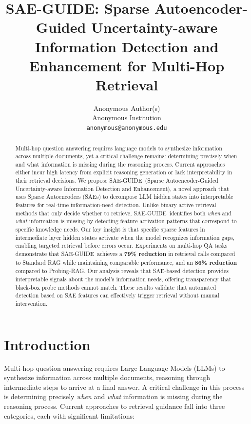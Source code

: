 \documentclass{article}
\title{SAE-GUIDE: Sparse Autoencoder-Guided Uncertainty-aware\\
Information Detection and Enhancement for Multi-Hop Retrieval}
\author{Anonymous Author(s)\\
Anonymous Institution\\
\texttt{anonymous@anonymous.edu}
}
\date{}
\newcommand{\ours}{SAE-GUIDE}
\begin{document}
\maketitle

\thispagestyle{fancy}

\begin{abstract}
Multi-hop question answering requires language models to synthesize information across multiple documents, yet a critical challenge remains: determining precisely when and what information is missing during the reasoning process. Current approaches either incur high latency from explicit reasoning generation or lack interpretability in their retrieval decisions. We propose \ours\ (Sparse Autoencoder-Guided Uncertainty-aware Information Detection and Enhancement), a novel approach that uses Sparse Autoencoders (SAEs) to decompose LLM hidden states into interpretable features for real-time information-need detection. Unlike binary active retrieval methods that only decide whether to retrieve, \ours\ identifies both \textit{when} and \textit{what} information is missing by detecting feature activation patterns that correspond to specific knowledge needs. Our key insight is that specific sparse features in intermediate layer hidden states activate when the model recognizes information gaps, enabling targeted retrieval before errors occur. Experiments on multi-hop QA tasks demonstrate that \ours\ achieves a \textbf{79\% reduction} in retrieval calls compared to Standard RAG while maintaining comparable performance, and an \textbf{86\% reduction} compared to Probing-RAG. Our analysis reveals that SAE-based detection provides interpretable signals about the model's information needs, offering transparency that black-box probe methods cannot match. These results validate that automated detection based on SAE features can effectively trigger retrieval without manual intervention.
\end{abstract}

\section{Introduction}

Multi-hop question answering requires Large Language Models (LLMs) to synthesize information across multiple documents, reasoning through intermediate steps to arrive at a final answer. A critical challenge in this process is determining precisely \textit{when} and \textit{what} information is missing during the reasoning process. Current approaches to retrieval guidance fall into three categories, each with significant limitations:
\end{document}
